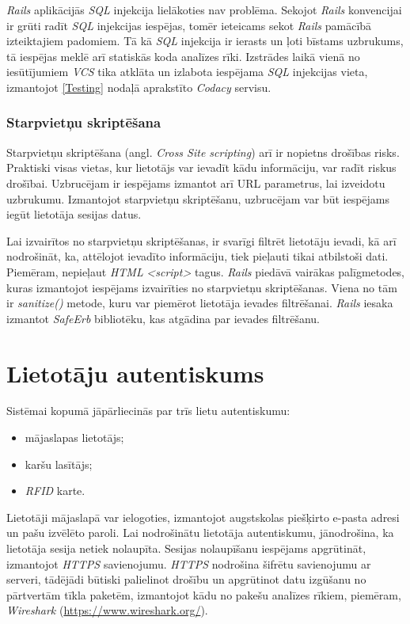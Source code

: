 \textit{Rails} aplikācijās \textit{SQL} injekcija lielākoties nav problēma. Sekojot \textit{Rails} konvencijai ir grūti radīt \textit{SQL} injekcijas iespējas, tomēr ieteicams sekot \textit{Rails} pamācībā \cite[security]{rails-guides} izteiktajiem padomiem. Tā kā \textit{SQL} injekcija ir ierasts un ļoti bīstams uzbrukums, tā iespējas meklē arī statiskās koda analīzes rīki. Izstrādes laikā vienā no iesūtījumiem \textit{VCS} tika atklāta un izlabota iespējama \textit{SQL} injekcijas vieta, izmantojot \ref{Testing} nodaļā aprakstīto \textit{Codacy} servisu.

\subsubsection{Starpvietņu skriptēšana}
Starpvietņu skriptēšana (angl. \textit{Cross Site scripting}) arī ir nopietns drošības risks. Praktiski visas vietas, kur lietotājs var ievadīt kādu informāciju, var radīt riskus drošībai. Uzbrucējam ir iespējams izmantot arī URL parametrus, lai izveidotu uzbrukumu. Izmantojot starpvietņu skriptēšanu, uzbrucējam var būt iespējams iegūt lietotāja sesijas datus.

Lai izvairītos no starpvietņu skriptēšanas, ir svarīgi filtrēt lietotāju ievadi, kā arī nodrošināt, ka, attēlojot ievadīto informāciju, tiek pieļauti tikai atbilstoši dati. Piemēram, nepieļaut \textit{HTML} \textit{<script>} tagus.
\textit{Rails} piedāvā vairākas palīgmetodes, kuras izmantojot iespējams izvairīties no starpvietņu skriptēšanas. Viena no tām ir \textit{sanitize()} metode, kuru var piemērot lietotāja ievades filtrēšanai. \textit{Rails} iesaka izmantot \textit{SafeErb} bibliotēku, kas atgādina par ievades filtrēšanu.

\section{Lietotāju autentiskums}
Sistēmai kopumā jāpārliecinās par trīs lietu autentiskumu:
\begin{itemize}
	\item mājaslapas lietotājs;
	\item karšu lasītājs;
	\item \textit{RFID} karte.
\end{itemize}
Lietotāji mājaslapā var ielogoties, izmantojot augstskolas piešķirto e-pasta adresi un pašu izvēlēto paroli. Lai nodrošinātu lietotāja autentiskumu, jānodrošina, ka lietotāja sesija netiek nolaupīta. Sesijas nolaupīšanu iespējams apgrūtināt, izmantojot \textit{HTTPS} savienojumu. \textit{HTTPS} nodrošina šifrētu savienojumu ar serveri, tādējādi būtiski palielinot drošību un apgrūtinot datu izgūšanu no pārtvertām tīkla paketēm, izmantojot kādu no pakešu analīzes rīkiem, piemēram, \textit{Wireshark} (\url{https://www.wireshark.org/}).

